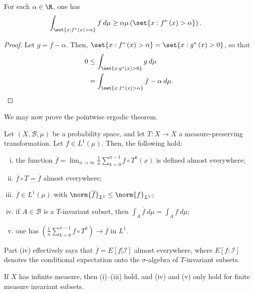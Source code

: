 \documentclass[10pt]{mypackage}
\begin{document}
\begin{corollary}
  For each $\alpha \in \R$, one has
  \begin{align*}
    \int_{\set{x : f^{\ast}(x) > \alpha}}^{} f\:d\mu &\geq \alpha \mu\left( \set{x : f^{\ast}\left( x \right) > \alpha} \right).
  \end{align*}
\end{corollary}
\begin{proof}
  Let $g = f - \alpha$. Then, $\set{x : f^{\ast}\left( x \right) > \alpha} = \set{x : g^{\ast}\left( x \right) > 0}$, so that
  \begin{align*}
    0 &\leq \int_{\set{x : g^{\ast}\left( x \right) > 0}}^{} g\:d\mu\\
      &= \int_{\set{x : f^{\ast}\left( x \right) > \alpha}}^{} f-\alpha\:d\mu.
  \end{align*}
\end{proof}
We may now prove the pointwise ergodic theorem.
\begin{theorem}
  Let $\left( X, \mathcal{B},\mu \right)$ be a probability space, and let $T\colon X\rightarrow X$ a measure-preserving transformation. Let $f\in L^1\left( \mu \right)$. Then, the following hold:
  \begin{enumerate}[(i)]
    \item the function $ \overline{f} = \lim_{n\rightarrow\infty} \frac{1}{n}\sum_{k=0}^{n-1}f\circ T^{k}\left( x \right)$ is defined almost everywhere;
    \item $ \overline{f}\circ T = \overline{f} $ almost everywhere;
    \item $ \overline{f}\in L^1\left( \mu \right) $ with $ \norm{ \overline{f} }_{L^1} \leq \norm{f}_{L^1}$;
    \item if $A\in \mathcal{B}$ is a $T$-invariant subset, then $ \int_{A}^{} \overline{f}\:d\mu = \int_{A}^{} f\:d\mu $;
    \item one has $\left( \frac{1}{n}\sum_{k=0}^{n-1}f\circ T^{k} \right) \rightarrow \overline{f}$ in $L^1$.
  \end{enumerate}
\end{theorem}
\begin{remark}
  Part (iv) effectively says that $ \overline{f} = E\left[ f | \mathcal{I} \right] $ almost everywhere, where $E\left[ f : \mathcal{I} \right]$ denotes the conditional expectation onto the $\sigma$-algebra of $T$-invariant subsets.

  If $X$ has infinite measure, then (i)--(iii) hold, and (iv) and (v) only hold for finite measure invariant subsets.
\end{remark}
\end{document}
